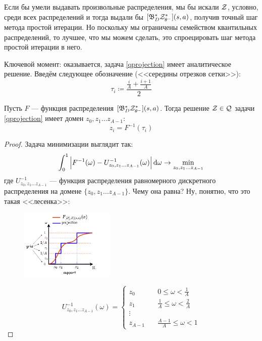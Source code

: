 Если бы умели выдавать произвольные распределения, мы бы искали $\mathcal{Z}$, условно, среди всех распределений и тогда выдали бы $[\mathfrak{B}^*_D \mathcal{Z}^*_{\theta^-}](s, a)$, получив точный шаг метода простой итерации. Но поскольку мы ограничены семейством квантильных распределений, то лучшее, что мы можем сделать, это спроецировать шаг метода простой итерации в него. 

Ключевой момент: оказывается, задача \eqref{qprojection} имеет аналитическое решение. Введём следующее обозначение (<<середины отрезков сетки>>):
$$\tau_i \coloneqq \frac{\frac{i}{A} + \frac{i + 1}{A}}{2}$$

\begin{theorem}
Пусть $F$ --- функция распределения $[\mathfrak{B}^*_D \mathcal{Z}^*_{\theta^-}](s, a)$. Тогда решение $\mathcal{Z} \in \mathcal{Q}$ задачи \eqref{qprojection} имеет домен $z_0, z_1 \dots z_{A-1}$:
$$z_i = F^{-1}(\tau_i)$$
\begin{proof}
Задача минимизации выглядит так:
\begin{equation}\label{Wassersteinminimization}
\int_0^1 \left| F^{-1}(\omega) - U^{-1}_{z_0, z_1 \dots z_{A-1}}(\omega) \right| \mathop{}\!\mathrm{d} \omega \to \min_{z_0, z_1 \dots z_{A-1}}
\end{equation}
где $ U^{-1}_{z_0, z_1 \dots z_{A-1}}$ --- функция распределения равномерного дискретного распределения на домене $\{z_0, z_1 \dots z_{A-1}\}$. Чему она равна? Ну, понятно, что это такая <<лесенка>>:

\begin{figure}
\vspace{-0.4cm}
\centering
\includegraphics[width=0.4\textwidth]{Images/quantileprojection.png}
\vspace{-1.8cm}
\end{figure}

$$U^{-1}_{z_0, z_1 \dots z_{A-1}}(\omega) = \begin{cases}
z_0 \quad &0 \le \omega < \frac{1}{A} \\
z_1 \quad &\frac{1}{A} \le \omega < \frac{2}{A} \\
\vdots \\
z_{A - 1} \quad &\frac{A - 1}{A} \le \omega < 1
\end{cases}$$


\end{proof}
\end{theorem}
